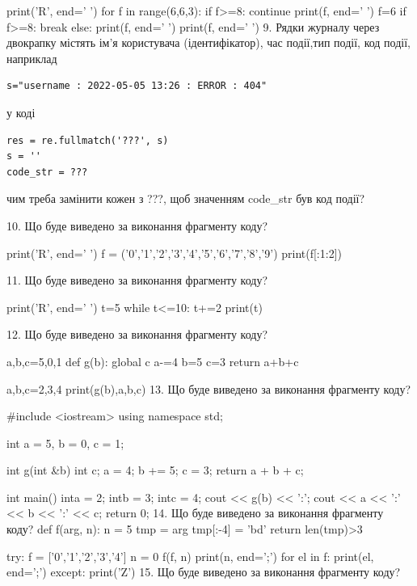 \documentclass[11pt]{article}
\begin{document}
print('R', end=' ')
for f in range(6,6,3):
    if f>=8:
        continue
        print(f, end=' ')
        f=6
    if f>=8:
        break
    else:
        print(f, end=' ')
    print(f, end=' ')
\vspace{5mm}
9. 
Рядки журналу через двокрапку містять ім'я користувача (ідентифікатор), час події,тип події, код події, наприклад
\begin{verbatim}
s="username : 2022-05-05 13:26 : ERROR : 404"
\end{verbatim}
у коді 
\begin{verbatim}
res = re.fullmatch('???', s) 
s = ''
code_str = ??? 
\end{verbatim}
чим треба замінити кожен з ???, щоб значенням code\_str був код події? 


\vspace{5mm}
10. Що буде виведено за виконання фрагменту коду?

print('R', end=' ')
f = ('0','1','2','3','4','5','6','7','8','9')
print(f[:1:2])

\vspace{5mm}
11. Що буде виведено за виконання фрагменту коду?

print('R', end=' ')
t=5
while t<=10:
    t+=2
print(t)

\vspace{5mm}
12. Що буде виведено за виконання фрагменту коду?

a,b,c=5,0,1
def g(b):
global c    a-=4
    b=5
    c=3
    return a+b+c

a,b,c=2,3,4
print(g(b),a,b,c)
\vspace{5mm}
13. Що буде виведено за виконання фрагменту коду?

#include <iostream>
using namespace std;

int a = 5, b = 0, c = 1;

int g(int &b){
int c;    a = 4;
    b += 5;
    c = 3;
    return a + b + c;
}

int main(){
    inta = 2;
    intb = 3;
    intc = 4;
    cout << g(b) << ':';
    cout << a << ':' << b << ':' << c;
    return 0; 
}
\vspace{5mm}
14. Що буде виведено за виконання фрагменту коду?
def f(arg, n):
    n = 5
    tmp = arg
    tmp[:-4] = 'bd'
    return len(tmp)>3

try:
    f = ['0','1','2','3','4']
    n = 0
    f(f, n)
    print(n, end=';')
    for el in f:
        print(el, end=';')
except:
    print('Z')
\vspace{5mm}
15. Що буде виведено за виконання фрагменту коду?
\end{document}

